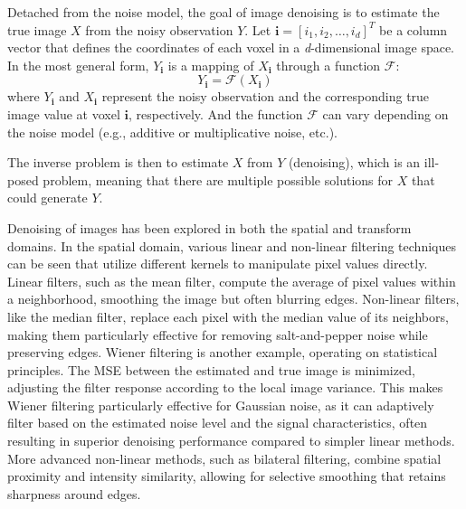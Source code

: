 Detached from the noise model, the goal of image denoising is to estimate the true image $X$ from the noisy observation $Y$. Let $\mathbf{i} = [i_1, i_2, \dots, i_d]^T$ be a column vector that defines the coordinates of each voxel in a \textit{d}-dimensional image space. In the most general form, $Y_{\mathbf{i}}$ is a mapping of $X_{\mathbf{i}}$ through a function $\mathcal{F}$:
\begin{equation*}
    Y_{\mathbf{i}} = \mathcal{F} (X_{\mathbf{i}})
\end{equation*}
where $Y_{\mathbf{i}}$ and $X_{\mathbf{i}}$ represent the noisy observation and the corresponding true image value at voxel $\mathbf{i}$, respectively. And the function $\mathcal{F}$ can vary depending on the noise model (e.g., additive or multiplicative noise, etc.).

The inverse problem is then to estimate $X$ from $Y$ (denoising), which is an ill-posed problem, meaning that there are multiple possible solutions for $X$ that could generate $Y$.

Denoising of images has been explored in both the spatial and transform domains. In the spatial domain, various linear and non-linear filtering techniques can be seen that utilize different kernels to manipulate pixel values directly. Linear filters, such as the mean filter, compute the average of pixel values within a neighborhood, smoothing the image but often blurring edges. Non-linear filters, like the median filter, replace each pixel with the median value of its neighbors, making them particularly effective for removing salt-and-pepper noise while preserving edges. Wiener filtering is another example, operating on statistical principles. The \gls{MSE} between the estimated and true image is minimized, adjusting the filter response according to the local image variance. This makes Wiener filtering particularly effective for Gaussian noise, as it can adaptively filter based on the estimated noise level and the signal characteristics, often resulting in superior denoising performance compared to simpler linear methods. More advanced non-linear methods, such as bilateral filtering, combine spatial proximity and intensity similarity, allowing for selective smoothing that retains sharpness around edges.

